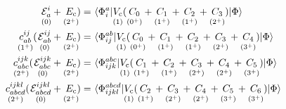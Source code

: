 \documentclass[11pt]{article}
\numberwithin{equation}{section}
\begin{document}
\begin{rmk}
\begin{align}
  \underset{(0)}{\vphantom{(}
    \mathcal{E}_a^i
  }
  +
  \underset{(2^+)}{\vphantom{(}
    E_{\mathrm{c}}
  }
  \hspace{-2pt}
  )
=&\
  \langle\Phi _i^a|
  \underset{(1)}{\vphantom{(}
    V_{\mathrm{c}}
  }
    (
    \underset{(0^+)}{\vphantom{(}
      C_0
    }
    +
    \underset{(1^+)}{\vphantom{(}
      C_1
    }
    +
    \underset{(1^+)}{\vphantom{(}
      C_2
    }
    +
    \underset{(2^+)}{\vphantom{(}
      C_3
    }
    )
  |\Phi \rangle
\\
\label{eq:ci-doubles-equation}
  \underset{(1^+)}{\vphantom{(}
  c_{ab}^{ij}
  }
  (\hspace{1pt}
  \underset{(0)}{\vphantom{(}
    \mathcal{E}_{ab}^{ij}
  }
  +
  \underset{(2^+)}{\vphantom{(}
    E_{\mathrm{c}}
  }
  \hspace{-2pt}
  )
=&\
  \langle\Phi _{ij}^{ab}|
  \underset{(1)}{\vphantom{(}
    V_{\mathrm{c}}
  }
    (
    \underset{(0^+)}{\vphantom{(}
      C_0
    }
    +
    \underset{(1^+)}{\vphantom{(}
      C_1
    }
    +
    \underset{(1^+)}{\vphantom{(}
      C_2
    }
    +
    \underset{(2^+)}{\vphantom{(}
      C_3
    }
    +
    \underset{(3^+)}{\vphantom{(}
      C_4
    }
    )
  |\Phi \rangle
\\
  \underset{(2^+)}{\vphantom{(}
  c_{abc}^{ijk}
  }
  (\hspace{1pt}
  \underset{(0)}{\vphantom{(}
    \mathcal{E}_{abc}^{ijk}
  }
  +
  \underset{(2^+)}{\vphantom{(}
    E_{\mathrm{c}}
  }
  \hspace{-2pt}
  )
=&\
  \langle\Phi _{ijk}^{abc}|
  \underset{(1)}{\vphantom{(}
    V_{\mathrm{c}}
  }
    (
    \underset{(1^+)}{\vphantom{(}
      C_1
    }
    +
    \underset{(1^+)}{\vphantom{(}
      C_2
    }
    +
    \underset{(2^+)}{\vphantom{(}
      C_3
    }
    +
    \underset{(2^+)}{\vphantom{(}
      C_4
    }
    +
    \underset{(3^+)}{\vphantom{(}
      C_5
    }
    )
  |\Phi \rangle
\\
  \underset{(2^+)}{\vphantom{(}
  c_{abcd}^{ijkl}
  }
  (\hspace{1pt}
  \underset{(0)}{\vphantom{(}
    \mathcal{E}_{abcd}^{ijkl}
  }
  +
  \underset{(2^+)}{\vphantom{(}
    E_{\mathrm{c}}
  }
  \hspace{-2pt}
  )
=&\
  \langle\Phi _{ijkl}^{abcd}|
  \underset{(1)}{\vphantom{(}
    V_{\mathrm{c}}
  }
    (
    \underset{(1^+)}{\vphantom{(}
      C_2
    }
    +
    \underset{(2^+)}{\vphantom{(}
      C_3
    }
    +
    \underset{(2^+)}{\vphantom{(}
      C_4
    }
    +
    \underset{(3^+)}{\vphantom{(}
      C_5
    }
    +
    \underset{(3^+)}{\vphantom{(}
      C_6
    }
    )
  |\Phi \rangle
\end{align}

\end{rmk}
\end{document}
